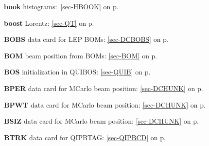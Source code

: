  \item{\bf book   }histograms:~\ref{sec-HBOOK} on p.~\pageref{sec-HBOOK}\\
 \item{\bf boost   }Lorentz: \ref{sec-QT} on p.~\pageref{sec-QT}\\
 \item{\bf BOBS    }data card for LEP BOMs: \ref{sec-DCBOBS} on p.~\pageref{sec-DCBOBS}\\
 \item{\bf BOM     }beam position from BOMs: \ref{sec-BOM} on p.~\pageref{sec-BOM}\\
 \item{\bf BOS     }initialization in QUIBOS: \ref{sec-QUIB} on p.~\pageref{sec-QUIB}\\
 \item{\bf BPER    }data card for MCarlo beam position: \ref{sec-DCHUNK} on p.~\pageref{sec-DCHUNK}\\
 \item{\bf BPWT    }data card for MCarlo beam position: \ref{sec-DCHUNK} on p.~\pageref{sec-DCHUNK}\\
 \item{\bf BSIZ    }data card for MCarlo beam position: \ref{sec-DCHUNK} on p.~\pageref{sec-DCHUNK}\\
 \item{\bf BTRK    }data card for QIPBTAG: \ref{sec-QIPBCD} on p.~\pageref{sec-QIPBCD}
 

